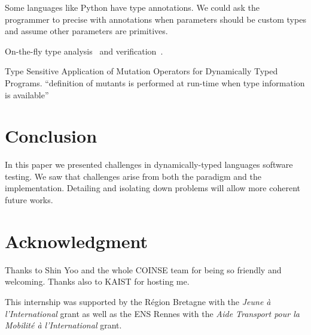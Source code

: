 \documentclass{llncs2e/llncs}
\begin{document}
Some languages like Python have type annotations. We could ask the programmer to
precise with annotations when parameters should be custom types and assume other
parameters are primitives.

On-the-fly type analysis~\cite{chambers1991iterative} and
verification~\cite{chugh2012nested}.

Type Sensitive Application of Mutation Operators for Dynamically Typed Programs.
``definition of mutants is performed at run-time when type information is
available''~\cite{bottaci2010type}


\section{Conclusion}
\label{conclusion}

In this paper we presented challenges in dynamically-typed languages software
testing. We saw that challenges arise from both the paradigm and the
implementation. Detailing and isolating down problems will allow more coherent
future works.


\section*{Acknowledgment}
Thanks to Shin Yoo and the whole COINSE team for being so friendly and
welcoming. Thanks also to KAIST for hosting me.

This internship was supported by the R\'egion Bretagne with the \textit{Jeune
\`a l'International} grant as well as the ENS Rennes with the \textit{Aide
Transport pour la Mobilit\'e \`a l'International} grant.



\end{document}
